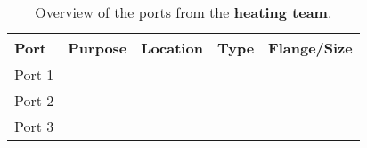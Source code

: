 \begin{table}[H]
    \centering
    \caption{Overview of the ports from the \textbf{heating team}.}
    \begin{tabular}{>{\raggedright\arraybackslash}p{2cm} >{\raggedright\arraybackslash}p{3cm} >{\raggedright\arraybackslash}p{3.5cm} >{\raggedright\arraybackslash}p{3.5cm} >{\raggedright\arraybackslash}p{2cm}}
        \toprule
        \textbf{Port} & \textbf{Purpose} & \textbf{Location} & \textbf{Type} & \textbf{Flange/Size} \\
        \midrule
        Port 1        &                  &                   &               &                      \\
        Port 2        &                  &                   &               &                      \\
        Port 3        &                  &                   &               &                      \\
        \bottomrule
    \end{tabular}
\end{table}
